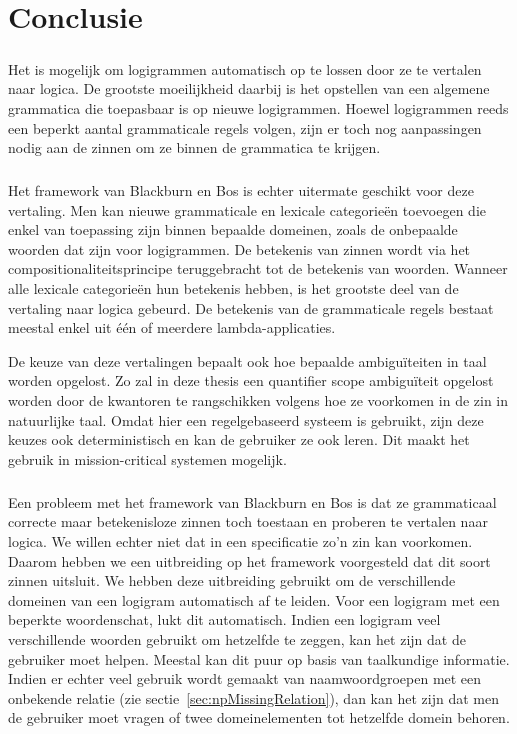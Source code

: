 \chapter{Conclusie}
\label{ch:conclusie}

\paragraph{}Het is mogelijk om logigrammen automatisch op te lossen door ze te vertalen naar logica. De grootste moeilijkheid daarbij is het opstellen van een algemene grammatica die toepasbaar is op nieuwe logigrammen. Hoewel logigrammen reeds een beperkt aantal grammaticale regels volgen, zijn er toch nog aanpassingen nodig aan de zinnen om ze binnen de grammatica te krijgen.

\paragraph{}Het framework van Blackburn en Bos \cite{Blackburn2005, Blackburn2006} is echter uitermate geschikt voor deze vertaling. Men kan nieuwe grammaticale en lexicale categorieën toevoegen die enkel van toepassing zijn binnen bepaalde domeinen, zoals de onbepaalde woorden dat zijn voor logigrammen. De betekenis van zinnen wordt via het compositionaliteitsprincipe teruggebracht tot de betekenis van woorden. Wanneer alle lexicale categorieën hun betekenis hebben, is het grootste deel van de vertaling naar logica gebeurd. De betekenis van de grammaticale regels bestaat meestal enkel uit één of meerdere lambda-applicaties.

De keuze van deze vertalingen bepaalt ook hoe bepaalde ambiguïteiten in taal worden opgelost. Zo zal in deze thesis een quantifier scope ambiguïteit opgelost worden door de kwantoren te rangschikken volgens hoe ze voorkomen in de zin in natuurlijke taal. Omdat hier een regelgebaseerd systeem is gebruikt, zijn deze keuzes ook deterministisch en kan de gebruiker ze ook leren. Dit maakt het gebruik in mission-critical systemen mogelijk.

\paragraph{}Een probleem met het framework van Blackburn en Bos is dat ze grammaticaal correcte maar betekenisloze zinnen toch toestaan en proberen te vertalen naar logica. We willen echter niet dat in een specificatie zo'n zin kan voorkomen. Daarom hebben we een uitbreiding op het framework voorgesteld dat dit soort zinnen uitsluit. We hebben deze uitbreiding gebruikt om de verschillende domeinen van een logigram automatisch af te leiden. Voor een logigram met een beperkte woordenschat, lukt dit automatisch. Indien een logigram veel verschillende woorden gebruikt om hetzelfde te zeggen, kan het zijn dat de gebruiker moet helpen. Meestal kan dit puur op basis van taalkundige informatie. Indien er echter veel gebruik wordt gemaakt van naamwoordgroepen met een onbekende relatie (zie sectie~\ref{sec:npMissingRelation}), dan kan het zijn dat men de gebruiker moet vragen of twee domeinelementen tot hetzelfde domein behoren.

